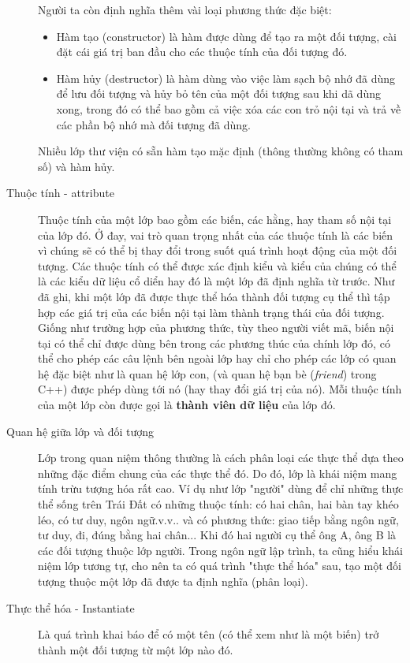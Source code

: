 \documentclass[10pt, a4paper]{article}
\begin{document}
\begin{description}
Người ta còn định nghĩa thêm vài loại phương thức đặc biệt:
\begin{itemize}
\item Hàm tạo (constructor) là hàm được dùng để tạo ra một đối tượng, cài đặt cái giá trị ban đầu cho các thuộc tính của đối tượng đó.
\item Hàm hủy (destructor) là hàm dùng vào việc làm sạch bộ nhớ đã dùng để lưu đối tượng và hủy bỏ tên của một đối tượng sau khi dã dùng xong, trong đó có thể bao gồm cả việc xóa các con trỏ nội tại và trả về các phần bộ nhớ mà đối tượng đã dùng.
\end{itemize}
Nhiều lớp thư viện có sẵn hàm tạo mặc định (thông thường không có tham số) và hàm hủy.
\item[Thuộc tính - attribute] Thuộc tính của một lớp bao gồm các biến, các hằng, hay tham số nội tại của lớp đó. Ở đay, vai trò quan trọng nhất của các thuộc tính là các biến vì chúng sẽ có thể bị thay đổi trong suốt quá trình hoạt động của một đối tượng. Các thuộc tính có thể được xác định kiểu và kiểu của chúng có thể là các kiểu dữ liệu cổ diển hay đó là một lớp đã định nghĩa từ trước. Như đã ghi, khi một lớp đã được thực thể hóa thành đối tượng cụ thể thì tập hợp các giá trị của các biến nội tại làm thành trạng thái của đối tượng. Giống như trường hợp của phương thức, tùy theo người viết mã, biến nội tại có thể chỉ được dùng bên trong các phương thúc của chính lớp đó, có thể cho phép các câu lệnh bên ngoài lớp hay chỉ cho phép các lớp có quan hệ đặc biệt như là quan hệ lớp con, (và quan hệ bạn bè (\emph{friend}) trong C++) được phép dùng tới nó (hay thay đổi giá trị của nó). Mỗi thuộc tính của một lớp còn được gọi là {\bf thành viên dữ liệu} của lớp đó.
\item[Quan hệ giữa lớp và đối tượng] Lớp trong quan niệm thông thường là cách phân loại các thực thể dựa theo những đặc điểm chung của các thực thể đó. Do đó, lớp là khái niệm mang tính trừu tượng hóa rất cao. Ví dụ như lớp "người" dùng để chỉ những thực thể sống trên Trái Đất có những thuộc tính: có hai chân, hai bàn tay khéo léo, có tư duy, ngôn ngữ.v.v.. và có phương thức: giao tiếp bằng ngôn ngữ, tư duy, đi, đúng bằng hai chân... Khi đó hai người cụ thể ông A, ông B là các đối tượng thuộc lớp người. Trong ngôn ngữ lập trình, ta cũng hiểu khái niệm lớp tương tự, cho nên ta có quá trình "thực thể hóa" sau, tạo một đối tượng thuộc một lớp đã được ta định nghĩa (phân loại).
\item[Thực thể hóa - Instantiate] Là quá trình khai báo để có một tên (có thể xem như là một biến) trở thành một đối tượng từ một lớp nào đó.


\end{description}
\end{document}
